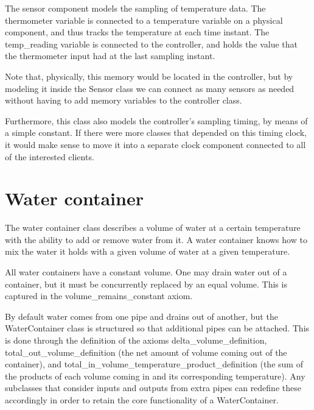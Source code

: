 \documentclass[a4paper,12pt]{article}
\begin{document}
The sensor component models the sampling of temperature data. The thermometer variable is connected to a temperature variable on a physical component, and thus tracks the temperature at each time instant. The temp\_reading variable is connected to the controller, and holds the value that the thermometer input had at the last sampling instant.

Note that, physically, this memory would be located in the controller, but by modeling it inside the Sensor class we can connect as many sensors as needed without having to add memory variables to the controller class.

Furthermore, this class also models the controller's sampling timing, by means of a simple constant. If there were more classes that depended on this timing clock, it would make sense to move it into a separate clock component connected to all of the interested clients.

\pagebreak
\begin{adjustwidth}{-4em}{-4em}
\end{adjustwidth}
\pagebreak

\section{Water container}

The water container class describes a volume of water at a certain temperature with the ability to add or remove water from it. A water container knows how to mix the water it holds with a given volume of water at a given temperature.

All water containers have a constant volume. One may drain water out of a container, but it must be concurrently replaced by an equal volume. This is captured in the volume\_remains\_constant axiom.

By default water comes from one pipe and drains out of another, but the WaterContainer class is structured so that additional pipes can be attached. This is done through the definition of the axioms delta\_volume\_definition, total\_out\_volume\_definition (the net amount of volume coming out of the container), and total\_in\_volume\_temperature\_product\_definition (the sum of the products of each volume coming in and its corresponding temperature). Any subclasses that consider inputs and outputs from extra pipes can redefine these accordingly in order to retain the core functionality of a WaterContainer.
\end{document}
